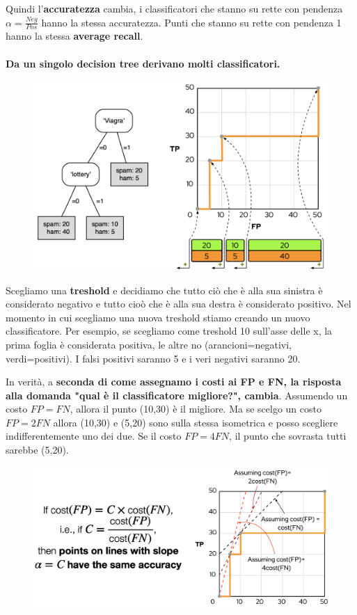 Quindi l'\textbf{accuratezza} cambia, i classificatori che stanno su rette con pendenza $\alpha = \frac{Neg}{Pos}$ hanno la stessa accuratezza. Punti che stanno su rette con pendenza 1 hanno la stessa \textbf{average recall}. 

\paragraph{Da un singolo decision tree derivano molti classificatori.}
\begin{figure}[!h]
    \centering
    \includegraphics[scale=0.5]{images/decTreeClass.png}
    \label{fig:enter-label}
\end{figure}
Scegliamo una \textbf{treshold} e decidiamo che tutto ciò che è alla sua sinistra è considerato negativo e tutto cioò che è alla sua destra è considerato positivo. Nel momento in cui scegliamo una nuova treshold stiamo creando un nuovo classificatore. Per esempio, se scegliamo come treshold 10 sull'asse delle x, la prima foglia è considerata positiva, le altre no (arancioni=negativi, verdi=positivi). I falsi positivi saranno 5 e i veri negativi saranno 20.

\newpage

In verità, a \textbf{seconda di come assegnamo i costi ai FP e FN, la risposta alla domanda "qual è il classificatore migliore?", cambia}. Assumendo un costo $FP=FN$, allora il punto (10,30) è il migliore. Ma se scelgo un costo $FP=2FN$ allora (10,30) e (5,20) sono sulla stessa isometrica e posso scegliere indifferentemente uno dei due. Se il costo $FP=4FN$, il punto che sovrasta tutti sarebbe (5,20).
\begin{figure}[!h]
    \centering
    \includegraphics[scale=0.5]{images/changeCost.png}
    \label{fig:enter-label}
\end{figure}

